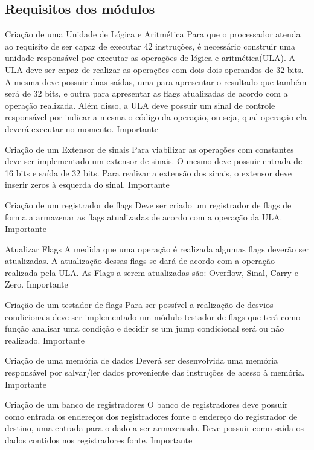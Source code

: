 \documentclass{report}
\begin{document}
    \subsection{Requisitos dos módulos}
    \begin{functional}
      \requirement
      {Criação de uma Unidade de Lógica e Aritmética}
      {Para que o processador atenda ao requisito de ser capaz de executar 42 instruções, é necessário construir uma unidade responsável por executar as operações de lógica e aritmética(ULA). A ULA deve ser capaz de realizar as operações com dois dois operandos de 32 bits. A mesma deve possuir duas saídas, uma para apresentar o resultado que também será de 32 bits, e outra para apresentar as flags atualizadas de acordo com a operação realizada. Além disso, a ULA deve possuir um sinal de controle responsável por indicar a mesma o código da operação, ou seja, qual operação ela deverá executar no momento.}
      {Importante}
      
       \requirement
      {Criação de um Extensor de sinais}
      {Para viabilizar as operações com constantes deve ser implementado um extensor de sinais. O mesmo deve possuir entrada de 16 bits e saída de 32 bits. Para realizar a extensão dos sinais, o extensor deve inserir zeros à esquerda do sinal.}
      {Importante}
      
       \requirement
      {Criação de um registrador de flags}
      {Deve ser criado um registrador de flags de forma a armazenar as flags atualizadas de acordo com a operação da ULA.}
      {Importante}
      
    \requirement
      {Atualizar Flags}
      {A medida que uma operação é realizada algumas flags deverão ser atualizadas. A atualização dessas flags se dará de acordo com a operação realizada pela ULA. As Flags a serem atualizadas são: Overflow, Sinal, Carry e Zero.}
      {Importante}
   
      \requirement
      {Criação de um testador de flags}
      {Para ser possível a realização de desvios condicionais deve ser implementado um módulo testador de flags que terá como função analisar uma condição e decidir se um jump condicional será ou não realizado.}
      {Importante}
      
       \requirement
      {Criação de uma memória de dados}
      {Deverá ser desenvolvida uma memória responsável por salvar/ler dados proveniente das instruções de acesso à memória.}
      {Importante}
      
       \requirement
      {Criação de um banco de registradores}
      {O banco de registradores deve possuir como entrada os endereços dos registradores fonte o endereço do registrador de destino, uma entrada para o dado a ser armazenado. Deve possuir como saída os dados contidos nos registradores fonte.}
      {Importante}
      

\end{functional}
\end{document}
